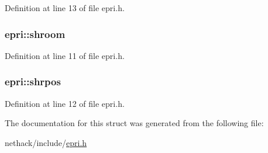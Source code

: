 Definition at line 13 of file epri.\+h.

\hypertarget{structepri_ac9a10c59c4b320cd888d28b6c2f86409}{
\subsubsection[{shroom}]{ epri\+::shroom}}\label{structepri_ac9a10c59c4b320cd888d28b6c2f86409}


Definition at line 11 of file epri.\+h.

\hypertarget{structepri_adb9efb6b7325d17c2f2403c8691259bf}{
\subsubsection[{shrpos}]{ epri\+::shrpos}}\label{structepri_adb9efb6b7325d17c2f2403c8691259bf}


Definition at line 12 of file epri.\+h.



The documentation for this struct was generated from the following file\+:\begin{DoxyCompactItemize}
\item 
nethack/include/\hyperlink{epri_8h}{epri.\+h}\end{DoxyCompactItemize}
